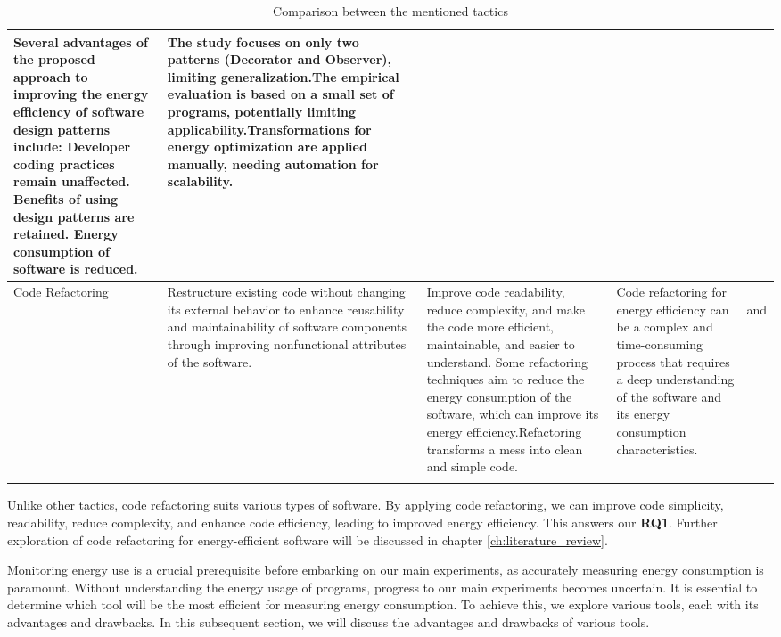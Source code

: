 {\begin{longtable}{|p{1.6cm}|p{3.5cm}|p{3cm}|p{3.5cm}|p{3.5cm}|}
 Several advantages of the proposed approach to improving the energy efficiency of software design patterns include: Developer coding practices remain unaffected. Benefits of using design patterns are retained. Energy consumption of software is reduced. & 
 The study focuses on only two patterns (Decorator and Observer), limiting generalization.The empirical evaluation is based on a small set of programs, potentially limiting applicability.Transformations for energy optimization are applied manually, needing automation for scalability.& 
 ~\cite{DBLP:conf/icse/NoureddineR15}\\
 \hline
 Code Refactoring & 
 Restructure existing code without changing its external behavior to enhance reusability and maintainability of software components through improving nonfunctional attributes of the software.& 
 Improve code readability, reduce complexity, and make the code more efficient, maintainable, and easier to understand.  Some refactoring techniques aim to reduce the energy consumption of the software, which can improve its energy efficiency.Refactoring transforms a mess into clean and simple code. & 
 Code refactoring for energy efficiency can be a complex and time-consuming process that requires a deep understanding of the software and its energy consumption characteristics. & 
 ~\cite{csanlialp2022energy}
 and
 ~\cite{DBLP:journals/cluster/KimHYL18}\\
 \hline
\caption{Comparison between the mentioned tactics}
\label{tab:Comparison between all mentioned tactics}
\end{longtable}
}

Unlike other tactics, code refactoring suits various types of software. By applying code refactoring, we can improve code simplicity, readability, reduce complexity, and enhance code efficiency, leading to improved energy efficiency. This answers our \textbf{RQ1}. Further exploration of code refactoring for energy-efficient software will be discussed in chapter \ref{ch:literature_review}.




\vspace{.5em}
Monitoring energy use is a crucial prerequisite before embarking on our main experiments, as accurately measuring energy consumption is paramount. Without understanding the energy usage of programs, progress to our main experiments becomes uncertain. It is essential to determine which tool will be the most efficient for measuring energy consumption. To achieve this, we explore various tools, each with its advantages and drawbacks. In this subsequent section, we will discuss the advantages and drawbacks of various tools.

